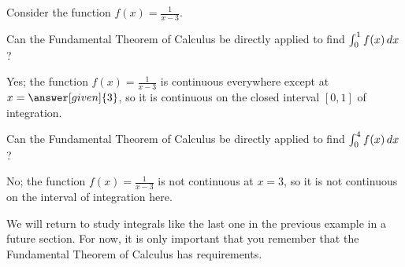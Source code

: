 \documentclass[nooutcomes]{ximera}
\begin{document}
\begin{example}
Consider the function $f(x) = \frac{1}{x-3}$.  

Can the Fundamental Theorem of Calculus be directly applied to find $\int_0^1 f(x) \mathop{}\!d x$?

\begin{explanation}
Yes; the function $f(x) = \frac{1}{x-3}$ is continuous everywhere except at $x=\answer[given]{3}$, so it is continuous on the closed interval $[0,1]$ of integration. 
\end{explanation}

Can the Fundamental Theorem of Calculus be directly applied to find $\int_0^4 f(x) \mathop{}\!d x$?

\begin{explanation}
No; the function $f(x) = \frac{1}{x-3}$ is not continuous at $x=3$, so it is not continuous on the interval of integration here. 
\end{explanation}

\end{example}

\begin{remark}
We will return to study integrals like the last one in the previous example in a future section.  For now, it is only important that you remember that the Fundamental Theorem of Calculus has requirements.
\end{remark}
\end{document}
